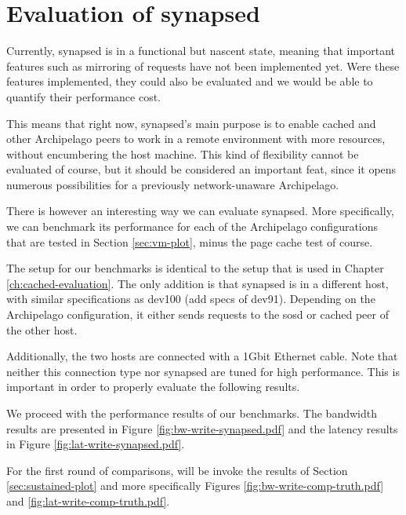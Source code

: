 \section{Evaluation of synapsed}

Currently, synapsed is in a functional but nascent state, meaning that 
important features such as mirroring of requests have not been implemented yet.  
Were these features implemented, they could also be evaluated and we would be 
able to quantify their performance cost.

This means that right now, synapsed's main purpose is to enable cached and 
other Archipelago peers to work in a remote environment with more resources, 
without encumbering the host machine. This kind of flexibility cannot be 
evaluated of course, but it should be considered an important feat, since it 
opens numerous possibilities for a previously network-unaware Archipelago.

There is however an interesting way we can evaluate synapsed. More 
specifically, we can benchmark its performance for each of the Archipelago 
configurations that are tested in Section \ref{sec:vm-plot}, minus the page 
cache test of course. 

The setup for our benchmarks is identical to the setup that is used in Chapter 
\ref{ch:cached-evaluation}. The only addition is that synapsed is in a 
different host, with similar specifications as dev100 (\fixme add specs of 
dev91).  Depending on the Archipelago configuration, it either sends requests 
to the sosd or cached peer of the other host.

Additionally, the two hosts are connected with a 1Gbit Ethernet cable. Note 
that neither this connection type nor synapsed are tuned for high performance.  
This is important in order to properly evaluate the following results.

We proceed with the performance results of our benchmarks. The bandwidth 
results are presented in Figure \ref{fig:bw-write-synapsed.pdf} and the latency 
results in Figure \ref{fig:lat-write-synapsed.pdf}.


For the first round of comparisons, will be invoke the results of Section 
\ref{sec:sustained-plot} and more specifically Figures 
\ref{fig:bw-write-comp-truth.pdf} and \ref{fig:lat-write-comp-truth.pdf}.

